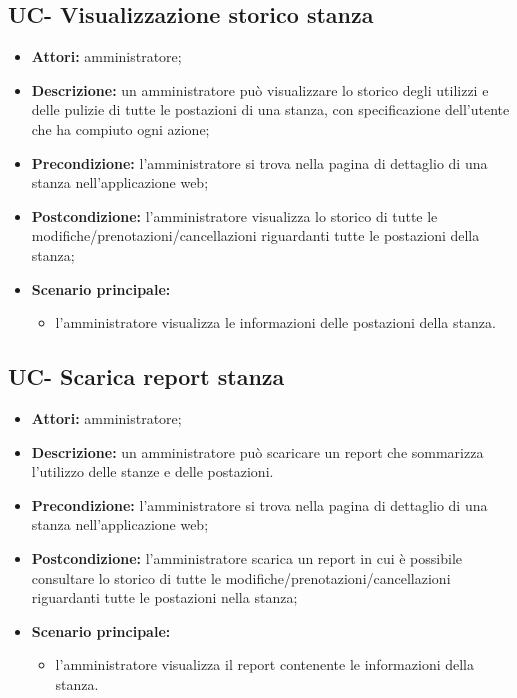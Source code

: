 \subsection{UC- Visualizzazione storico stanza}
\begin{itemize}
    \item \textbf{Attori:} amministratore;
    \item \textbf{Descrizione:} un amministratore pu\`{o} visualizzare lo storico degli utilizzi e delle pulizie di tutte le postazioni di una stanza, con specificazione dell'utente che ha compiuto ogni azione;
    \item \textbf{Precondizione:} l'amministratore si trova nella pagina di dettaglio di una stanza nell'applicazione web;
    \item \textbf{Postcondizione:} l'amministratore visualizza lo storico di tutte le modifiche/prenotazioni/cancellazioni riguardanti tutte le postazioni della stanza;
    \item \textbf{Scenario principale:}
    \begin{itemize}
        \item l'amministratore visualizza le informazioni delle postazioni della stanza.
    \end{itemize}
\end{itemize}


\subsection{UC- Scarica report stanza}
\begin{itemize}
    \item \textbf{Attori:} amministratore;
    \item \textbf{Descrizione:} un amministratore pu\`{o} scaricare un report che sommarizza l'utilizzo delle stanze e delle postazioni.
    \item \textbf{Precondizione:} l'amministratore si trova nella pagina di dettaglio di una stanza nell'applicazione web;
    \item \textbf{Postcondizione:} l'amministratore scarica un report in cui \`{e} possibile consultare lo storico di tutte le modifiche/prenotazioni/cancellazioni riguardanti tutte le postazioni nella stanza;
    \item \textbf{Scenario principale:}
    \begin{itemize}
        \item l'amministratore visualizza il report contenente le informazioni della stanza.
    \end{itemize}
\end{itemize}
